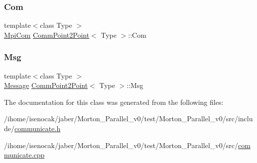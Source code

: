 \subsubsection{\texorpdfstring{Com}{Com}}
{\footnotesize\ttfamily template$<$class Type $>$ \\
\mbox{\hyperlink{structMpiCom}{Mpi\+Com}} \mbox{\hyperlink{classCommPoint2Point}{Comm\+Point2\+Point}}$<$ Type $>$\+::Com\hspace{0.3cm}{\ttfamily [private]}}

\mbox{\label{classCommPoint2Point_ab3b02cefcb07c7d4dbd0ce262d5eb6bd}} 
\subsubsection{\texorpdfstring{Msg}{Msg}}
{\footnotesize\ttfamily template$<$class Type $>$ \\
\mbox{\hyperlink{structMessage}{Message}} \mbox{\hyperlink{classCommPoint2Point}{Comm\+Point2\+Point}}$<$ Type $>$\+::Msg\hspace{0.3cm}{\ttfamily [private]}}



The documentation for this class was generated from the following files\+:\begin{DoxyCompactItemize}
\item 
/ihome/isenocak/jaber/\+Morton\+\_\+\+Parallel\+\_\+v0/test/\+Morton\+\_\+\+Parallel\+\_\+v0/src/include/\mbox{\hyperlink{communicate_8h}{communicate.\+h}}\item 
/ihome/isenocak/jaber/\+Morton\+\_\+\+Parallel\+\_\+v0/test/\+Morton\+\_\+\+Parallel\+\_\+v0/src/\mbox{\hyperlink{communicate_8cpp}{communicate.\+cpp}}\end{DoxyCompactItemize}
